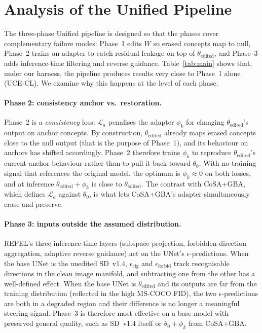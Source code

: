 \documentclass[10pt,twocolumn,letterpaper]{article}
\begin{document}
\section{Analysis of the Unified Pipeline}
\label{sec:analysis}

The three-phase Unified pipeline is designed so that the phases cover
complementary failure modes: Phase~1 edits $W$ so erased concepts map
to null, Phase~2 trains an adapter to catch residual leakage on top of
$\theta_\text{edited}$, and Phase~3 adds inference-time filtering and
reverse guidance. Table~\ref{tab:main} shows that, under our harness,
the pipeline produces results very close to Phase~1 alone (UCE-CL). We
examine why this happens at the level of each phase.

\paragraph{Phase 2: consistency anchor vs.\ restoration.} Phase~2 is a
\emph{consistency} loss:
$\mathcal{L}_a$ penalises the adapter $\phi_k$ for changing
$\theta_\text{edited}$'s output on anchor concepts. By
construction, $\theta_\text{edited}$ already maps erased concepts close
to the null output (that is the purpose of Phase~1), and its behaviour
on anchors has shifted accordingly. Phase~2 therefore trains $\phi_k$
to reproduce $\theta_\text{edited}$'s current anchor behaviour rather
than to pull it back toward $\theta_0$. With no training signal that
references the original model, the optimum is
$\phi_k \approx 0$ on both losses, and at inference
$\theta_\text{edited} + \phi_k$ is close to $\theta_\text{edited}$. The
contrast with CoSA+GBA, which defines $\mathcal{L}_a$ against
$\theta_0$, is what lets CoSA+GBA's adapter simultaneously erase and
preserve.

\paragraph{Phase 3: inputs outside the assumed distribution.} REPEL's
three inference-time layers (subspace projection, forbidden-direction
aggregation, adaptive reverse guidance) act on the UNet's
$\epsilon$-predictions. When the base UNet is the unedited SD~v1.4,
$\epsilon_\text{cfg}$ and $\epsilon_\text{forbid}$ track recognisable
directions in the clean image manifold, and subtracting one from the
other has a well-defined effect. When the base UNet is
$\theta_\text{edited}$ and its outputs are far from the training
distribution (reflected in the high MS-COCO FID), the two
$\epsilon$-predictions are both in a degraded region and their
difference is no longer a meaningful steering signal. Phase~3 is
therefore most effective on a base model with preserved general
quality, such as SD~v1.4 itself or $\theta_0 + \phi_k$ from CoSA+GBA.
\end{document}
